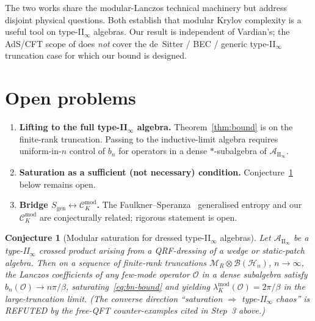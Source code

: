 \documentclass[12pt,a4paper]{article}
\newtheorem{conjecture}{Conjecture}
\begin{document}
The two works share the modular-Lanczos technical machinery but
address disjoint physical questions. Both establish that modular
Krylov complexity is a useful tool on type-II$_\infty$ algebras.
Our result is independent of Vardian's; the AdS/CFT scope of
\cite{Vardian2026} does \emph{not} cover the de~Sitter / BEC /
generic type-II$_\infty$ truncation case for which our bound is
designed.

\section{Open problems}
\label{sec:open}

\begin{enumerate}
\item \textbf{Lifting to the full type-II$_\infty$ algebra.}
Theorem~\ref{thm:bound} is on the finite-rank truncation. Passing
to the inductive-limit algebra requires uniform-in-$n$ control of
$b_n$ for operators in a dense $\ast$-subalgebra of
$\mathcal{A}_{\mathrm{II}_\infty}$.
\item \textbf{Saturation as a sufficient (not necessary) condition.}
Conjecture~\ref{conj:saturation} below remains open.
\item \textbf{Bridge $S_{\mathrm{gen}} \leftrightarrow
\mathcal{C}_K^{\mathrm{mod}}$.}
The Faulkner--Speranza~\cite{FaulknerSperanza2024} generalised
entropy and our $\mathcal{C}_K^{\mathrm{mod}}$ are conjecturally
related; rigorous statement is open.
\end{enumerate}

\begin{conjecture}[Modular saturation for dressed type-II$_\infty$
algebras]\label{conj:saturation}
Let $\mathcal{A}_{\mathrm{II}_\infty}$ be a type-II$_\infty$ crossed
product arising from a QRF-dressing of a wedge or static-patch algebra.
Then on a sequence of finite-rank truncations
$\mathcal{M}_R \otimes \mathcal{B}(\mathcal{H}_n)$, $n\to\infty$,
the Lanczos coefficients of any few-mode operator $\mathcal{O}$ in a
dense subalgebra satisfy $b_n(\mathcal{O}) \to n\pi/\beta$,
saturating~\eqref{eq:bn-bound} and yielding
$\lambda_K^{\mathrm{mod}}(\mathcal{O}) = 2\pi/\beta$ in the
large-truncation limit. (The converse direction
``saturation $\Rightarrow$ type-II$_\infty$ chaos'' is REFUTED by
the free-QFT counter-examples cited in Step~3 above.)
\end{conjecture}
\end{document}
